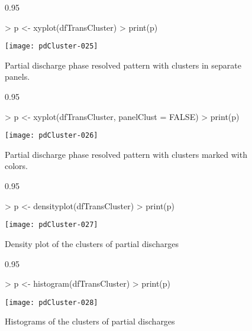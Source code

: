 \documentclass{article}
\renewenvironment{Schunk}{\begin{center}
    \scriptsize
    \begin{boxedminipage}{0.95\textwidth}}{
    \end{boxedminipage}\end{center}}
\begin{document}
\begin{figure}
  \centering
\begin{Schunk}
\begin{Sinput}
> p <- xyplot(dfTransCluster)
> print(p)
\end{Sinput}
\end{Schunk}
\texttt{[image: pdCluster-025]}
  \caption{Partial discharge phase resolved pattern with clusters in
    separate panels.}
  \label{fig:xyplotClusterSeparate}
\end{figure}

\begin{figure}
  \centering
\begin{Schunk}
\begin{Sinput}
> p <- xyplot(dfTransCluster, panelClust = FALSE)
> print(p)
\end{Sinput}
\end{Schunk}
\texttt{[image: pdCluster-026]}
  \caption{Partial discharge phase resolved pattern with clusters
    marked with colors.}
  \label{fig:xyplotCluster}
\end{figure}

\begin{figure}
  \centering
\begin{Schunk}
\begin{Sinput}
> p <- densityplot(dfTransCluster)
> print(p)
\end{Sinput}
\end{Schunk}
\texttt{[image: pdCluster-027]}
  \caption{Density plot of the clusters of partial discharges}
  \label{fig:densityCluster}
\end{figure}

\begin{figure}
  \centering
\begin{Schunk}
\begin{Sinput}
> p <- histogram(dfTransCluster)
> print(p)
\end{Sinput}
\end{Schunk}
\texttt{[image: pdCluster-028]}
  \caption{Histograms of the clusters of partial discharges}
  \label{fig:histogramsCluster}
\end{figure}



\end{document}
